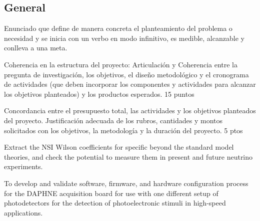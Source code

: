 \documentclass[a4paper,10pt,epsfig,epsf,amsfonts,amsmath]{article}
\begin{document}
\subsection{General}
\begin{colciencias}
  Enunciado que define de manera concreta el planteamiento del
  problema o necesidad y se inicia con un verbo en modo infinitivo, es
  medible, alcanzable y conlleva a una meta.
\end{colciencias}
\begin{evaluacion}
  Coherencia en la estructura del proyecto:
Articulación y Coherencia entre la pregunta de
investigación, los objetivos, el diseño metodológico y
el cronograma de actividades (que deben incorporar
los componentes y actividades para alcanzar los
objetivos planteados) y los productos esperados. 15
puntos

Concordancia entre el presupuesto total, las
actividades y los objetivos planteados del proyecto.
Justificación adecuada de los rubros, cantidades y
montos solicitados con los objetivos, la metodología
y la duración del proyecto. 5 ptos
\end{evaluacion}
Extract the NSI Wilson coefficients for specific beyond the standard model theories, and check the potential to measure them in present and future neutrino experiments.


To develop and validate software, firmware, and hardware configuration process for the DAPHNE acquisition board for use with one different setup of photodetectors for the detection of photoelectronic stimuli in high-speed applications.
\end{document}
